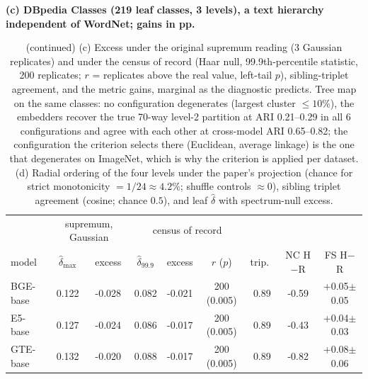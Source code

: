 \begin{table}[tbp]\ContinuedFloat
\centering
\scriptsize
\setlength{\tabcolsep}{2.6pt}
\begingroup
\noindent\textbf{(c) DBpedia Classes (219 leaf classes, 3 levels), a text hierarchy independent of WordNet; gains in pp.}\par\vspace{1.5pt}
\setlength{\tabcolsep}{2.5pt}
\begin{tabular}{lcc|ccc|ccc}
\toprule
 & \multicolumn{2}{c|}{supremum, Gaussian} & \multicolumn{3}{c|}{census of record} & & & \\
model & $\hat\delta_{\max}$ & excess & $\hat\delta_{99.9}$ & excess & $r$ ($p$) & trip.\ & NC H$-$R & FS H$-$R \\
\midrule
BGE-base & 0.122 & -0.028 & 0.082 & -0.021 & 200 (0.005) & 0.89 & -0.59 & +0.05$\pm$0.05 \\
E5-base & 0.127 & -0.024 & 0.086 & -0.017 & 200 (0.005) & 0.89 & -0.43 & +0.04$\pm$0.03 \\
GTE-base & 0.132 & -0.020 & 0.088 & -0.017 & 200 (0.005) & 0.89 & -0.82 & +0.08$\pm$0.06 \\
\bottomrule
\end{tabular}
\par\vspace{5pt}
\endgroup
\caption{(continued) (c) Excess under the original supremum reading (3 Gaussian replicates) and under the census of record (Haar null, 99.9th-percentile statistic, 200 replicates; $r$ = replicates above the real value, left-tail $p$), sibling-triplet agreement, and the metric gains, marginal as the diagnostic predicts. Tree map on the same classes: no configuration degenerates (largest cluster $\le10$\%), the embedders recover the true 70-way level-2 partition at ARI 0.21--0.29 in all 6 configurations and agree with each other at cross-model ARI 0.65--0.82; the configuration the criterion selects there (Euclidean, average linkage) is the one that degenerates on ImageNet, which is why the criterion is applied per dataset. (d) Radial ordering of the four levels under the paper's projection (chance for strict monotonicity $=1/24\approx4.2\%$; shuffle controls $\approx0$), sibling triplet agreement (cosine; chance $0.5$), and leaf $\hat\delta$ with spectrum-null excess. %
}
\end{table}
